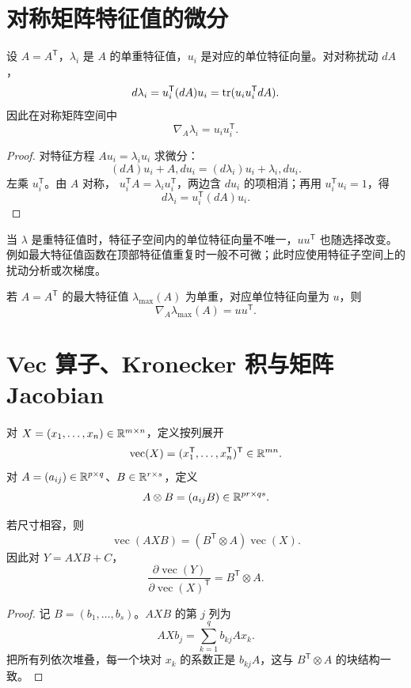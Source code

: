 \section{对称矩阵特征值的微分}

\begin{theorem}[简单特征值的一阶扰动]
设 $A=A^{\mathsf T}$，$\lambda_i$ 是 $A$ 的单重特征值，$u_i$ 是对应的单位特征向量。对对称扰动 $dA$，
\[
d\lambda_i=u_i^{\mathsf T}(dA)u_i
=\operatorname{tr}(u_iu_i^{\mathsf T}dA).
\]
因此在对称矩阵空间中
\[
\nabla_A\lambda_i=u_iu_i^{\mathsf T}.
\]
\end{theorem}
\begin{proof}
对特征方程 $Au_i=\lambda_iu_i$ 求微分：
\[
(dA)u_i+A,du_i
=(d\lambda_i)u_i+\lambda_i,du_i.
\]
左乘 $u_i^{\mathsf T}$。由 $A$ 对称，
$u_i^{\mathsf T}A=\lambda_i u_i^{\mathsf T}$，两边含 $du_i$ 的项相消；再用 $u_i^{\mathsf T}u_i=1$，得
\[
d\lambda_i=u_i^{\mathsf T}(dA)u_i.
\]
\end{proof}

\begin{pitfall}[重特征值处不能指定唯一梯度]
当 $\lambda$ 是重特征值时，特征子空间内的单位特征向量不唯一，$uu^{\mathsf T}$ 也随选择改变。例如最大特征值函数在顶部特征值重复时一般不可微；此时应使用特征子空间上的扰动分析或次梯度。
\end{pitfall}

\begin{corollary}[最大特征值的梯度]
若 $A=A^{\mathsf T}$ 的最大特征值 $\lambda_{\max}(A)$ 为单重，对应单位特征向量为 $u$，则
\[
\nabla_A\lambda_{\max}(A)=uu^{\mathsf T}.
\]
\end{corollary}

\section{Vec 算子、Kronecker 积与矩阵 Jacobian}

\begin{definition}
对 $X=(x_1,\ldots,x_n)\in\mathbb{R}^{m\times n}$，定义按列展开
\[
\operatorname{vec}(X)
=(x_1^{\mathsf T},\ldots,x_n^{\mathsf T})^{\mathsf T}\in\mathbb{R}^{mn}.
\]
对 $A=(a_{ij})\in\mathbb{R}^{p\times q}$、$B\in\mathbb{R}^{r\times s}$，定义
\[
A\otimes B=(a_{ij}B)\in\mathbb{R}^{pr\times qs}.
\]
\end{definition}

\begin{theorem}
若尺寸相容，则
\[
\boxed{\operatorname{vec}(AXB)
=(B^{\mathsf T}\otimes A)\operatorname{vec}(X).}
\]
因此对 $Y=AXB+C$，
\[
\frac{\partial\operatorname{vec}(Y)}
{\partial\operatorname{vec}(X)^{\mathsf T}}
=B^{\mathsf T}\otimes A.
\]
\end{theorem}
\begin{proof}
记 $B=(b_1,\ldots,b_s)$。$AXB$ 的第 $j$ 列为
\[
AXb_j=\sum_{k=1}^q b_{kj}Ax_k.
\]
把所有列依次堆叠，每一个块对 $x_k$ 的系数正是 $b_{kj}A$，这与 $B^{\mathsf T}\otimes A$ 的块结构一致。
\end{proof}

